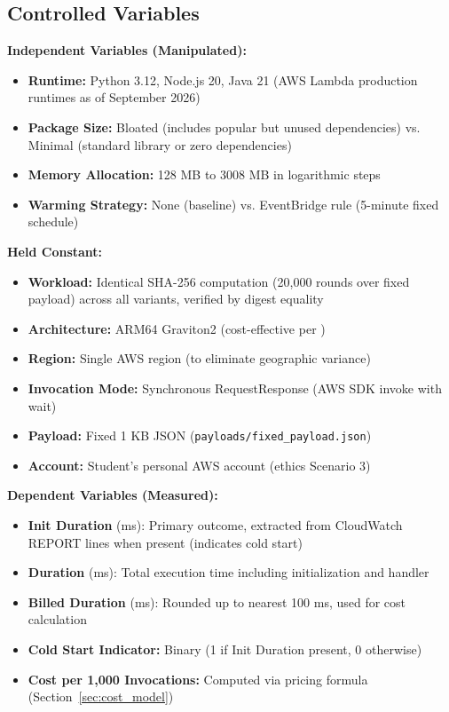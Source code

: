 \subsection{Controlled Variables}

\textbf{Independent Variables (Manipulated):}

\begin{itemize}
    \item \textbf{Runtime:} Python 3.12, Node.js 20, Java 21 (AWS Lambda production runtimes as of September 2026)
    \item \textbf{Package Size:} Bloated (includes popular but unused dependencies) vs. Minimal (standard library or zero dependencies)
    \item \textbf{Memory Allocation:} 128 MB to 3008 MB in logarithmic steps
    \item \textbf{Warming Strategy:} None (baseline) vs. EventBridge rule (5-minute fixed schedule)
\end{itemize}

\textbf{Held Constant:}

\begin{itemize}
    \item \textbf{Workload:} Identical SHA-256 computation (20,000 rounds over fixed payload) across all variants, verified by digest equality
    \item \textbf{Architecture:} ARM64 Graviton2 (cost-effective per \citet{bluemke2025ijet})
    \item \textbf{Region:} Single AWS region (to eliminate geographic variance)
    \item \textbf{Invocation Mode:} Synchronous RequestResponse (AWS SDK invoke with wait)
    \item \textbf{Payload:} Fixed 1 KB JSON (\texttt{payloads/fixed\_payload.json})
    \item \textbf{Account:} Student's personal AWS account (ethics Scenario 3)
\end{itemize}

\textbf{Dependent Variables (Measured):}

\begin{itemize}
    \item \textbf{Init Duration} (ms): Primary outcome, extracted from CloudWatch REPORT lines when present (indicates cold start)
    \item \textbf{Duration} (ms): Total execution time including initialization and handler
    \item \textbf{Billed Duration} (ms): Rounded up to nearest 100 ms, used for cost calculation
    \item \textbf{Cold Start Indicator:} Binary (1 if Init Duration present, 0 otherwise)
    \item \textbf{Cost per 1,000 Invocations:} Computed via pricing formula (Section~\ref{sec:cost_model})
\end{itemize}

